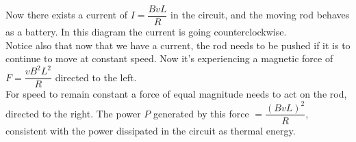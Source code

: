 \documentclass[a4paper,12pt]{article}
\begin{document}
\begin{center}
\end{center}
Now there exists a current of $I=\dfrac{BvL}{R}$ in the circuit, and the moving rod behaves as a battery. In this diagram the current is going counterclockwise. \\
Notice also that now that we have a current, the rod needs to be pushed if it is to continue to move at constant speed. Now it's experiencing a magnetic force of $F=\dfrac{vB^2L^2}{R}$ directed to the left.\\
For speed to remain constant a force of equal magnitude needs to act on the rod, directed to the right. The power $P$ generated by this force $=\dfrac{(BvL)^2}{R}$, consistent with the power dissipated in the circuit as thermal energy.
\end{document}
